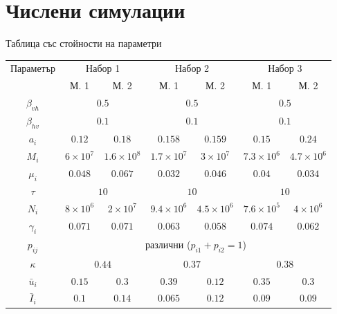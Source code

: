 \section{\hspace{1em} Числени симулации}
\begin{frame}[t]{Таблица със стойности на параметри}
  \begin{footnotesize}
      \begin{tabular}{ |c ||c c c c c c|  }
        \hline
        \multirow{2}{*}{Параметър}& \multicolumn{2}{c}{Набор 1}& \multicolumn{2}{c}{Набор 2} & \multicolumn{2}{c|}{Набор 3}\\
        & М. 1 & М. 2 & М. 1 & М. 2 & М. 1 & М. 2\\
        \hline
        $\beta_{vh}$ & \multicolumn{2}{c}{$0.5$} & \multicolumn{2}{c}{$0.5$}  & \multicolumn{2}{c|}{$0.5$}\\
        $\beta_{hv}$ & \multicolumn{2}{c}{$0.1$} & \multicolumn{2}{c}{$0.1$} & \multicolumn{2}{c|}{$0.1$}\\
        $a_i$ & $0.12$ & $0.18$ & $0.158$ & $0.159$ & $0.15$ & $0.24$\\
        $M_i$ & $6 \times 10^7$ & $1.6 \times 10^8$ & $1.7 \times 10^7$ & $3 \times 10^7$ & $7.3 \times 10^6$ & $4.7 \times 10^6$\\
        $\mu_i$ & $0.048$ & $0.067$ & $0.032$ & $0.046$ & $0.04$ & $0.034$\\
        $\tau$ & \multicolumn{2}{c}{$10$} & \multicolumn{2}{c}{$10$} & \multicolumn{2}{c|}{$10$}\\
        $N_i$ & $8 \times 10^6$ & $2 \times 10^7$ & $9.4 \times 10^6$ & $4.5 \times 10^6$ & $7.6 \times 10^5$ & $4 \times 10^6$\\
        $\gamma_i$ & $0.071$ & $0.071$ & $0.063$ & $0.058$ & $0.074$ & $0.062$\\
        $p_{ij}$ & \multicolumn{6}{c|}{различни ($p_{i1}+p_{i2}=1$)}\\
        $\kappa$ & \multicolumn{2}{c}{$0.44$} & \multicolumn{2}{c}{$0.37$} & \multicolumn{2}{c|}{$0.38$}\\
        $\bar{u}_i$ & $0.15$ & $0.3$ & $0.39$ & $0.12$ & $0.35$ & $0.3$\\
        $\bar{I}_i$ & $0.1$ & $0.14$ & $0.065$ & $0.12$ & $0.09$ & $0.09$\\
        \hline
      \end{tabular}
    \end{footnotesize}
\end{frame}

